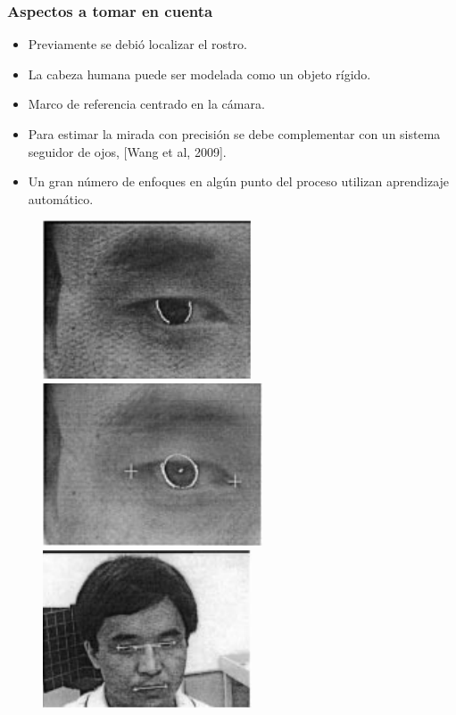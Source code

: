 \documentclass[10pt, compress]{beamer}
\begin{document}
\begin{frame}[fragile]
	\frametitle{Aspectos a tomar en cuenta}
	 \begin{itemize}
	 	\item Previamente se debió localizar el rostro.
	 	\item La cabeza humana puede ser modelada como un objeto rígido.
	 	\item Marco de referencia centrado en la cámara.
	 	\item Para estimar la mirada con precisión se debe complementar con un sistema seguidor de ojos, [Wang et al, 2009].
	 	\item Un gran número de enfoques en algún punto del proceso utilizan aprendizaje automático.
	 \end{itemize}
	 
	 \begin{figure}[htbp] 
	 	\centering
	 	\includegraphics[width=.27\textwidth]{./pictures/gaze1}
	 	\includegraphics[width=.28\textwidth]{./pictures/gaze2}
	 	\includegraphics[width=.27\textwidth]{./pictures/gaze3}
	 \end{figure}	
\end{frame}
	
\end{document}
